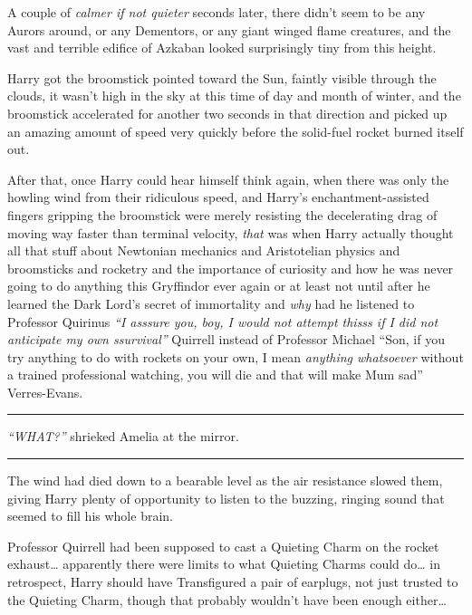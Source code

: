A couple of \emph{calmer if not quieter} seconds later, there didn't
seem to be any Aurors around, or any Dementors, or any giant winged
flame creatures, and the vast and terrible edifice of Azkaban looked
surprisingly tiny from this height.

Harry got the broomstick pointed toward the Sun, faintly visible through
the clouds, it wasn't high in the sky at this time of day and month of
winter, and the broomstick accelerated for another two seconds in that
direction and picked up an amazing amount of speed very quickly before
the solid-fuel rocket burned itself out.

After that, once Harry could hear himself think again, when there was
only the howling wind from their ridiculous speed, and Harry's
enchantment-assisted fingers gripping the broomstick were merely
resisting the decelerating drag of moving way faster than terminal
velocity, \emph{that} was when Harry actually thought all that stuff
about Newtonian mechanics and Aristotelian physics and broomsticks and
rocketry and the importance of curiosity and how he was never going to
do anything this Gryffindor ever again or at least not until after he
learned the Dark Lord's secret of immortality and \emph{why} had he
listened to Professor Quirinus \emph{``I asssure you, boy, I would not
attempt thisss if I did not anticipate my own ssurvival''} Quirrell
instead of Professor Michael ``Son, if you try anything to do with
rockets on your own, I mean \emph{anything whatsoever} without a trained
professional watching, you will die and that will make Mum sad''
Verres-Evans.

\begin{center}\rule{3in}{0.4pt}\end{center}

\emph{``WHAT?''} shrieked Amelia at the mirror.

\begin{center}\rule{3in}{0.4pt}\end{center}

The wind had died down to a bearable level as the air resistance slowed
them, giving Harry plenty of opportunity to listen to the buzzing,
ringing sound that seemed to fill his whole brain.

Professor Quirrell had been supposed to cast a Quieting Charm on the
rocket exhaust\ldots{} apparently there were limits to what Quieting
Charms could do\ldots{} in retrospect, Harry should have Transfigured a
pair of earplugs, not just trusted to the Quieting Charm, though that
probably wouldn't have been enough either\ldots{}

